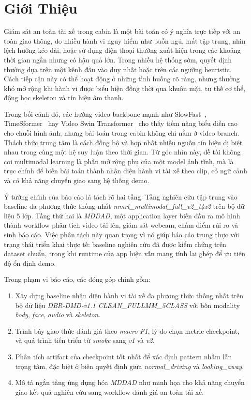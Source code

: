 \documentclass[conference,a4paper]{IEEEtran}
\begin{document}
\section[Gioi Thieu]{Giới Thiệu}
Giám sát an toàn tài xế trong cabin là một bài toán có ý nghĩa trực tiếp với an toàn giao thông, do nhiều hành vi nguy hiểm như buồn ngủ, mất tập trung, nhìn lệch hướng kéo dài, hoặc sử dụng điện thoại thường xuất hiện trong các khoảng thời gian ngắn nhưng có hậu quả lớn. Trong nhiều hệ thống sớm, quyết định thường dựa trên một kênh đầu vào duy nhất hoặc trên các ngưỡng heuristic. Cách tiếp cận này có thể hoạt động ở những tình huống rõ ràng, nhưng thường khó mở rộng khi hành vi được biểu hiện đồng thời qua khuôn mặt, tư thế cơ thể, động học skeleton và tín hiệu âm thanh.

Trong bối cảnh đó, các hướng video backbone mạnh như SlowFast~\cite{slowfast}, TimeSformer~\cite{timesformer} hay Video Swin Transformer~\cite{videoswin} cho thấy tiềm năng biểu diễn cao cho chuỗi hình ảnh, nhưng bài toán trong cabin không chỉ nằm ở video branch. Thách thức trung tâm là cách đồng bộ và hợp nhất nhiều nguồn tín hiệu dị biệt nhau trong cùng một hệ suy luận theo thời gian. Từ góc nhìn này, đề tài không coi multimodal learning là phần mở rộng phụ của một model ảnh tĩnh, mà là trục chính để biến bài toán thành nhận diện hành vi tài xế theo clip, có ngữ cảnh và có khả năng chuyển giao sang hệ thống demo.

Ý tưởng chính của báo cáo là tách rõ hai tầng. Tầng nghiên cứu tập trung vào baseline đa phương thức thống nhất \textit{mmrt\_multimodal\_full\_v2\_t4x2} trên bộ dữ liệu 5 lớp. Tầng thứ hai là \textit{MDDAD}, một application layer biến đầu ra mô hình thành workflow phân tích video tải lên, giám sát webcam, chấm điểm rủi ro và sinh báo cáo. Việc phân tách này quan trọng vì nó giúp báo cáo trung thực với trạng thái triển khai thực tế: baseline nghiên cứu đã được kiểm chứng trên dataset chuẩn, trong khi runtime của app hiện vẫn mang tính lai ghép để ưu tiên độ ổn định demo.

Trong phạm vi báo cáo, các đóng góp chính gồm:
\begin{enumerate}
\item Xây dựng baseline nhận diện hành vi tài xế đa phương thức thống nhất trên bộ dữ liệu \textit{DBR-DMD-v1.1 CLEAN\_FULLMM\_5CLASS} với bốn modality \textit{body}, \textit{face}, \textit{audio} và \textit{skeleton}.
\item Trình bày giao thức đánh giá theo \textit{macro-F1}, lý do chọn metric checkpoint, và quá trình tiến triển từ \textit{smoke} sang \textit{v1} và \textit{v2}.
\item Phân tích artifact của checkpoint tốt nhất để xác định pattern nhầm lẫn trọng tâm, đặc biệt ở biên quyết định giữa \textit{normal\_driving} và \textit{looking\_away}.
\item Mô tả ngắn tầng ứng dụng hóa \textit{MDDAD} như minh họa cho khả năng chuyển giao kết quả nghiên cứu sang workflow đánh giá an toàn tài xế.
\end{enumerate}
\end{document}
